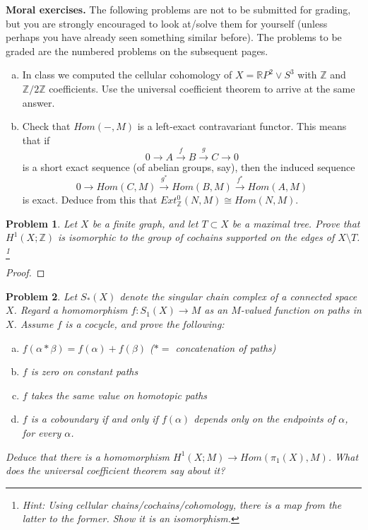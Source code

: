 \documentclass[11pt]{article}
\newtheorem{problem}{Problem}
\begin{document}
{\bf Moral exercises.} The following problems are not to be submitted for grading, but you are strongly encouraged to look at/solve them for yourself (unless perhaps you have already seen something similar before). The problems to be graded are the numbered problems on the subsequent pages.
\begin{enumerate}[(a)]
\item In class we computed the cellular cohomology of $X=\mathbb RP^2\vee S^3$ with $\mathbb Z$ and $\mathbb Z/2\mathbb Z$ coefficients. Use the universal coefficient theorem to arrive at the same answer. 

\item Check that $Hom(-,M)$ is a left-exact contravariant functor. This means that if 
\[0\to A\xrightarrow{f} B\xrightarrow{g} C\to 0\] is a short exact sequence (of abelian groups, say), then the induced sequence 
\[0\to Hom(C,M)\xrightarrow{g^*} Hom(B,M)\xrightarrow{f^*}Hom(A,M)\]
is exact. Deduce from this that $Ext^0_{\mathbb Z}(N,M)\cong Hom(N,M)$. 
\end{enumerate}


\pagebreak 



\begin{problem}
Let $X$ be a finite graph, and let $T\subset X$ be a maximal tree. Prove that $H^1(X;\mathbb Z)$ is isomorphic to the group of cochains supported on the edges of $X\setminus T$. \footnote{Hint: Using cellular chains/cochains/cohomology, there is a map from the latter to the former. Show it is an isomorphism.}
\end{problem}

\begin{proof}

\end{proof} 

\pagebreak

\begin{problem}
Let $S_*(X)$ denote the singular chain complex of a connected space $X$. Regard a homomorphism $f:S_1(X)\to M$ as an $M$-valued function on paths in $X$. Assume $f$ is a cocycle, and prove the following: 
\begin{enumerate}[(a)]
\item $f(\alpha*\beta)=f(\alpha)+f(\beta)$ ($*=$ concatenation of paths)
\item $f$ is zero on constant paths
\item  $f$ takes the same value on homotopic paths
\item $f$ is a coboundary if and only if $f(\alpha)$ depends only on the endpoints of $\alpha$, for every $\alpha$. 
\end{enumerate} 
Deduce that there is a homomorphism $H^1(X;M)\to Hom(\pi_1(X),M)$. What does the universal coefficient theorem say about it? 
\end{problem}
\end{document}
